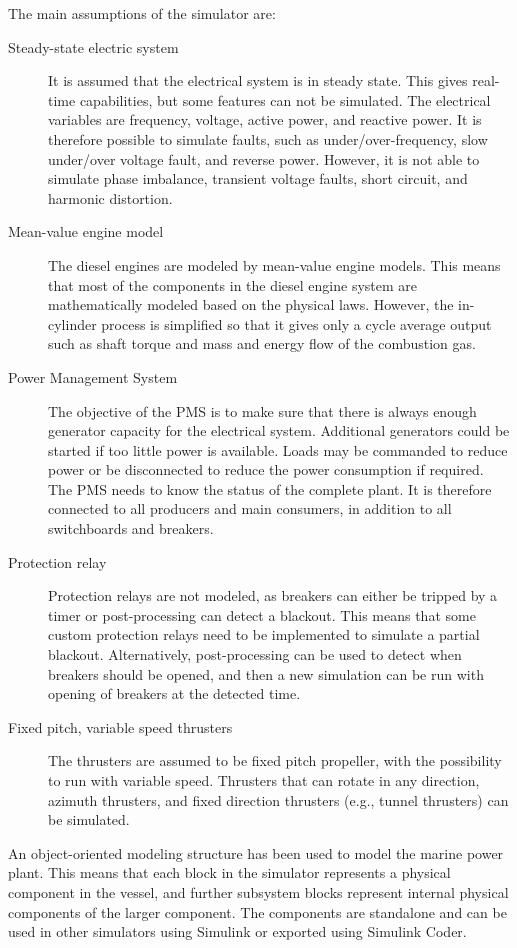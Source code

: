 \documentclass[twocolumn,10pt]{asme2e}
\begin{document}
The main assumptions of the simulator are:
\begin{description}
\item[Steady-state electric system ] It is assumed that the electrical system is in steady state. This gives real-time capabilities, but some features can not be simulated.
The electrical variables are frequency, voltage, active power, and reactive power.
It is therefore possible to simulate faults, such as under/over-frequency, slow under/over voltage fault, and reverse power.
However, it is not able to simulate phase imbalance, transient voltage faults, short circuit, and harmonic distortion.
\item[Mean-value engine model] The diesel engines are modeled by mean-value engine models. This means that most of the components in the diesel engine system are mathematically modeled based on the physical laws. 
However, the in-cylinder process is simplified so that it gives only a cycle average output such as shaft torque and mass and energy flow of the combustion gas.
\item[Power Management System] The objective of the PMS is to make sure that there is always enough generator capacity for the electrical system. 
Additional generators could be started if too little power is available.
Loads may be commanded to reduce power or be disconnected to reduce the power consumption if required.
The PMS needs to know the status of the complete plant.
It is therefore connected to all producers and main consumers, in addition to all switchboards and breakers.
\item[Protection relay] Protection relays are not modeled, as breakers can either be tripped by a timer or post-processing can detect a blackout.
This means that some custom protection relays need to be implemented to simulate a partial blackout.
Alternatively, post-processing can be used to detect when breakers should be opened, and then a new simulation can be run with opening of breakers at the detected time.
\item[Fixed pitch, variable speed thrusters] The thrusters are assumed to be fixed pitch propeller, with the possibility to run with variable speed.
Thrusters that can rotate in any direction, azimuth thrusters, and fixed direction thrusters (e.g., tunnel thrusters) can be simulated.
\end{description}

An object-oriented modeling structure has been used to model the marine power plant.
This means that each block in the simulator represents a physical component in the vessel, and further subsystem blocks represent internal physical components of the larger component.
The components are standalone and can be used in other simulators using Simulink or exported using Simulink Coder.
\end{document}
